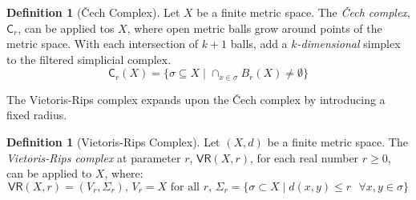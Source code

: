 \documentclass[ma]{uncgdissertationexp}
\theoremstyle{plain}
\theoremstyle{definition}
\newtheorem{definition}[theorem]{Definition}
\theoremstyle{remark}
\begin{document}
\begin{definition}[Čech Complex]
Let $X$ be a finite metric space. The \textit{Čech complex}, $\mathsf{C}_r$, can be applied tos $X$, where open metric balls grow around points of the metric space. With each intersection of $k+1$ balls, add a $k$\textit{-dimensional} simplex to the filtered simplicial complex.\\
$$\mathsf{C}_{r}(X) = \{\sigma \subseteq X \mid \cap_{x \in \sigma} B_{r}(X) \not= \emptyset\}$$
\end{definition}

\par The Vietoris-Rips complex expands upon the Čech complex by introducing a fixed radius.

\begin{definition}[Vietoris-Rips Complex]
Let $(X, d)$ be a finite metric space. The \textit{Vietoris-Rips complex} at parameter $r$, $\mathsf{VR}(X, r)$, for each real number $r\geq0$, can be applied to $X$, where:
$$\mathsf{VR}(X, r) = (V_{r}, \Sigma_{r})\text{, }V_{r}=X\text{ for all }r\text{, }\Sigma_{r} = \{\sigma \subset X \mid d(x,y) \leq r\text{ }\forall x, y \in \sigma\}$$
\end{definition}
\end{document}
